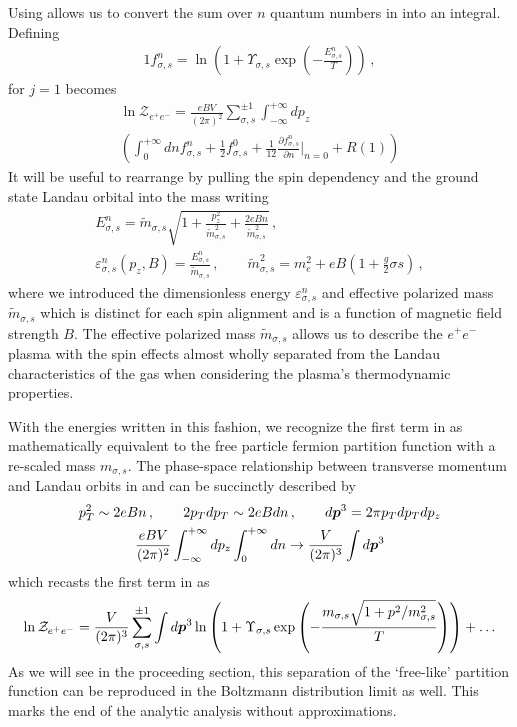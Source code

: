 Using  allows us to convert the sum over $n$ quantum numbers in  into an integral. Defining
\begin{alignat}{1}
    \label{Func} f_{\sigma,s}^{n}=\ln\left(1+\Upsilon_{\sigma,s}\exp\left(-\frac{E_{\sigma,s}^{n}}{T}\right)\right)\,,
\end{alignat}
 for $j=1$ becomes
\begin{multline}
    \label{PartFuncTwo} \ln\mathcal{Z}_{e^{+}e^{-}} = \frac{e{B}V}{(2\pi)^{2}}\sum_{\sigma,s}^{\pm1}\int_{-\infty}^{+\infty}dp_{z}\\
    \left(\int_{0}^{+\infty}dn f_{\sigma,s}^{n} + \frac{1}{2}f_{\sigma,s}^{0} + \frac{1}{12}\frac{\partial f_{\sigma,s}^{n}}{\partial n}\bigg\rvert_{n=0} + R(1)\right)
\end{multline}
It will be useful to rearrange  by pulling the spin dependency and the ground state Landau orbital into the mass writing
\begin{gather}
 \label{effmass:1}
 E^{n}_{\sigma,s}={\tilde m}_{\sigma,s}\sqrt{1+\frac{p_{z}^{2}}{{\tilde m}_{\sigma,s}^{2}}+\frac{2e{B}n}{{\tilde m}_{\sigma,s}^{2}}}\,,\\
 \label{effmass:2}
 \varepsilon_{\sigma,s}^{n}(p_{z},{B})=\frac{E_{\sigma,s}^{n}}{{\tilde m}_{\sigma,s}}\,,\qquad{\tilde m}_{\sigma,s}^{2}=m_{e}^{2}+e{B}\left(1+\frac{g}{2}\sigma s\right)\,,
\end{gather}
where we introduced the dimensionless energy $\varepsilon^{n}_{\sigma,s}$ and effective polarized mass ${\tilde m}_{\sigma,s}$ which is distinct for each spin alignment and is a function of magnetic field strength ${B}$. The effective polarized mass ${\tilde m}_{\sigma,s}$ allows us to describe the $e^{+}e^{-}$ plasma with the spin effects almost wholly separated from the Landau characteristics of the gas when considering the plasma's thermodynamic properties.

With the energies written in this fashion, we recognize the first term in  as mathematically equivalent to the free particle fermion partition function with a re-scaled mass $m_{\sigma,s}$. The phase-space relationship between transverse momentum and Landau orbits in  and  can be succinctly described by
\begin{gather}
    p_{T}^{2} \sim 2eBn\,,\qquad2p_{T}dp_{T} \sim 2eBdn\,,\qquad d\boldsymbol{p}^{3}=2\pi p_{T}dp_{T}dp_{z}\\
    \frac{eBV}{(2\pi)^{2}}\int_{-\infty}^{+\infty}dp_{z}\int_{0}^{+\infty}dn \rightarrow \frac{V}{(2\pi)^{3}}\int d\boldsymbol{p}^{3}
\end{gather}
which recasts the first term in  as
\begin{align}
    \label{FreePart}
    \ln\mathcal{Z}_{e^{+}e^{-}} = \frac{V}{(2\pi)^{3}}\sum_{\sigma,s}^{\pm1}\int d\boldsymbol{p}^{3}\ln\left(1+\Upsilon_{\sigma,s}\exp{\left(-\frac{m_{\sigma,s}\sqrt{1+p^{2}/m_{\sigma,s}^{2}}}{T}\right)}\right)+\ldots
\end{align}
As we will see in the proceeding section, this separation of the `free-like' partition function can be reproduced in the Boltzmann distribution limit as well. This marks the end of the analytic analysis without approximations.

